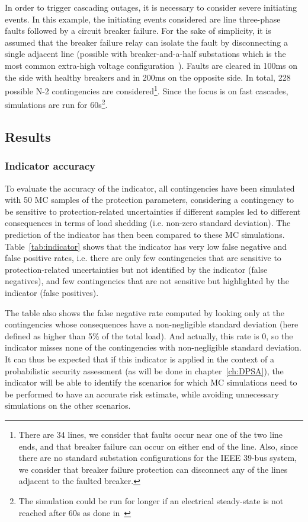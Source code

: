 In order to trigger cascading outages, it is necessary to consider severe initiating events. In this example, the initiating events considered are line three-phase faults followed by a circuit breaker failure. For the sake of simplicity, it is assumed that the breaker failure relay can isolate the fault by disconnecting a single adjacent line (possible with breaker-and-a-half substations which is the most common extra-high voltage configuration~\cite{HorowitzBook}). Faults are cleared in 100ms on the side with healthy breakers and in 200ms on the opposite side. In total, 228 possible N-2 contingencies are considered\footnote{There are 34 lines, we consider that faults occur near one of the two line ends, and that breaker failure can occur on either end of the line. Also, since there are no standard substation configurations for the IEEE 39-bus system, we consider that breaker failure protection can disconnect any of the lines adjacent to the faulted breaker.}. Since the focus is on fast cascades, simulations are run for 60s\footnote{The simulation could be run for longer if an electrical steady-state is not reached after 60s as done in~\cite{DCATphase1, MCDETasTool}}.


\subsection{Results}
\label{sec:protection_results}

\subsubsection{Indicator accuracy}

To evaluate the accuracy of the indicator, all contingencies have been simulated with 50 MC samples of the protection parameters, considering a contingency to be sensitive to protection-related uncertainties if different samples led to different consequences in terms of load shedding (i.e. non-zero standard deviation). The prediction of the indicator has then been compared to these MC simulations. Table~\ref{tab:indicator} shows that the indicator has very low false negative and false positive rates, i.e. there are only few contingencies that are sensitive to protection-related uncertainties but not identified by the indicator (false negatives), and few contingencies that are not sensitive but highlighted by the indicator (false positives).

The table also shows the false negative rate computed by looking only at the contingencies whose consequences have a non-negligible standard deviation (here defined as higher than 5\% of the total load). And actually, this rate is 0, so the indicator misses none of the contingencies with non-negligible standard deviation. It can thus be expected that if this indicator is applied in the context of a probabilistic security assessment (as will be done in chapter~\ref{ch:DPSA}), the indicator will be able to identify the scenarios for which MC simulations need to be performed to have an accurate risk estimate, while avoiding unnecessary simulations on the other scenarios.

